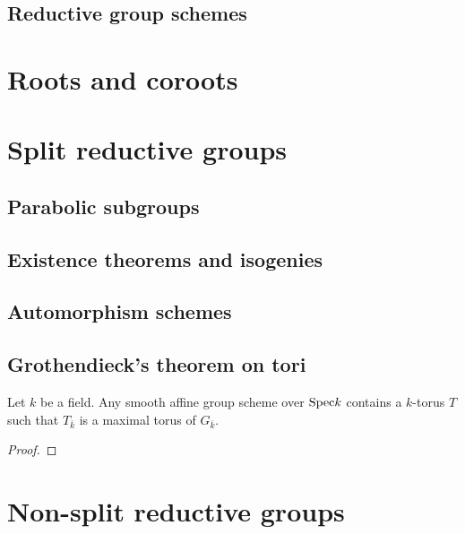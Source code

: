     \subsection{Reductive group schemes}

\section{Roots and coroots}

\section{Split reductive groups}
    \subsection{Parabolic subgroups}
    
    \subsection{Existence theorems and isogenies}
    
    \subsection{Automorphism schemes}
    
    \subsection{Grothendieck's theorem on tori}
        \begin{theorem} \label{theorem: grothendieck_theorem_on_tori}
            Let $k$ be a field. Any smooth affine group scheme over $\mathrm{Spec} k$ contains a $k$-torus $T$ such that $T_{\bar{k}}$ is a maximal torus of $G_{\bar{k}}$.
        \end{theorem}
            \begin{proof}
            
            \end{proof}
            
\section{Non-split reductive groups}